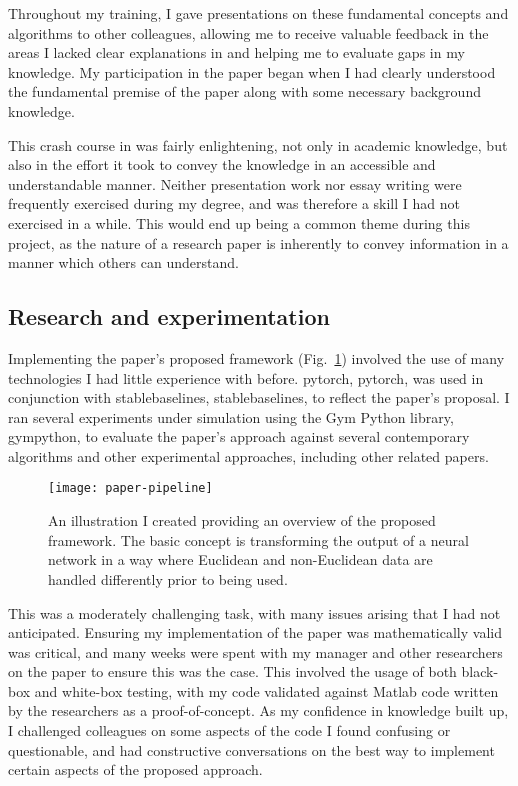 Throughout my training, I gave presentations on these fundamental concepts and algorithms to other
colleagues, allowing me to receive valuable feedback in the areas I lacked clear explanations in and
helping me to evaluate gaps in my knowledge. My participation in the paper began when I had clearly
understood the fundamental premise of the paper along with some necessary background
knowledge.

This crash course in  was fairly enlightening, not only in academic knowledge, but also in
the effort it took to convey the knowledge in an accessible and understandable manner. Neither
presentation work nor essay writing were frequently exercised during my degree, and was therefore a
skill I had not exercised in a while. This would end up being a common theme during this project, as
the nature of a research paper is inherently to convey information in a manner which others can
understand.

\subsection{Research and experimentation}

Implementing the paper's proposed framework (Fig.~\ref{fig:paper-framework}) involved the
use of many technologies I had little experience with before. \gls*{pytorch}, \glsdesc*{pytorch},
was used in conjunction with \gls*{stablebaselines}, \glsdesc*{stablebaselines}, to reflect the
paper's proposal. I ran several experiments under simulation using the Gym Python library,
\glsdesc*{gympython}, to evaluate the paper's approach against several contemporary 
algorithms and other experimental approaches, including other related papers.

\begin{figure}
    \centering
    \texttt{[image: paper-pipeline]}
    \caption{An illustration I created providing an overview of the proposed framework. The basic
        concept is transforming the output of a neural network in a way where Euclidean and
        non-Euclidean data are handled differently prior to being used.\label{fig:paper-framework}}
\end{figure}

This was a moderately challenging task, with many issues arising that I had not anticipated.
Ensuring my implementation of the paper was mathematically valid was critical, and many weeks were
spent with my manager and other researchers on the paper to ensure this was the case. This involved
the usage of both black-box and white-box testing, with my code validated against Matlab code
written by the researchers as a proof-of-concept. As my confidence in knowledge built up, I
challenged colleagues on some aspects of the code I found confusing or questionable, and had
constructive conversations on the best way to implement certain aspects of the proposed approach.

